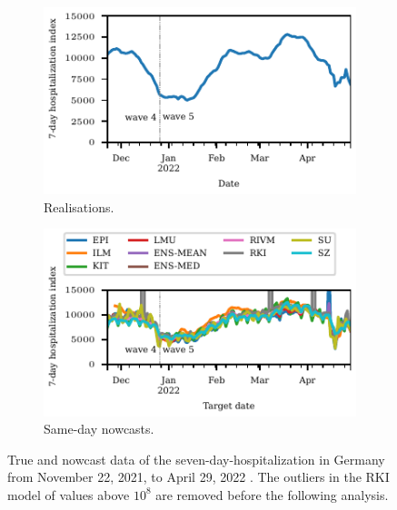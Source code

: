 \documentclass[pdflatex]{sn-jnl}
\theoremstyle{plain}%
\theoremstyle{definition}
\begin{document}
\begin{figure}
    \centering
    \begin{subfigure}[t]{0.48\textwidth}
    \includegraphics{plots/covid_nowcast/00_true_data}
    \caption{Realisations.}
    \label{fig:app-covid-true}
    \end{subfigure}\hfill
    \begin{subfigure}[t]{0.48\textwidth}
    \includegraphics{plots/covid_nowcast/00_nowcast_data}
    \caption{Same-day nowcasts.}
    \label{fig:app-covid-nowcast}
        \end{subfigure}
    \caption[True and nowcast data of the seven-day-hospitalization in Germany from November 22, 2021, to April 29, 2022.]{True and nowcast data of the seven-day-hospitalization in Germany from November 22, 2021, to April 29, 2022 \citep{ChairOfEconometricsAndStatisticsAtKarlsruheInstituteOfTechnology2024}.
    The outliers in the RKI model of values above $10^8$ are removed before the following analysis.}
    \label{fig:app-covid-true-nowcast}
\end{figure}
\end{document}
